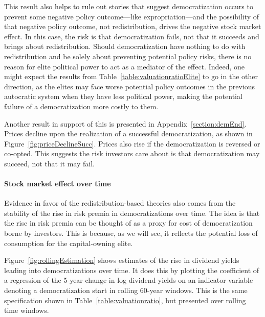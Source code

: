 

\label{par:rule_out_expro_beg}
This result also helps to rule out stories that suggest democratization occurs to prevent some negative policy outcome---like expropriation---and the possibility of that negative policy outcome, not redistribution, drives the negative stock market effect. In this case, the risk is that democratization fails, not that it succeeds and brings about redistribution. Should democratization have nothing to do with redistribution and be solely about preventing potential policy risks, there is no reason for elite political power to act as a mediator of the effect. Indeed, one might expect the results from Table~\ref{table:valuationratioElite} to go in the other direction, as the elites may face worse potential policy outcomes in the previous autocratic system when they have less political power, making the potential failure of a democratization more costly to them.

Another result in support of this is presented in Appendix~\ref{section:demEnd}. Prices decline upon the realization of a successful democratization, as shown in Figure~\ref{fig:priceDeclineSucc}. Prices also rise if the democratization is reversed or co-opted. This suggests the risk investors care about is that democratization may succeed, not that it may fail.
\label{par:rule_out_expro_end}

\paragraph{Stock market effect over time}

Evidence in favor of the redistribution-based theories also comes from the stability of the rise in risk premia in democratizations over time. The idea is that the rise in risk premia can be thought of as a proxy for cost of democratization borne by investors. This is because, as we will see, it reflects the potential loss of consumption for the capital-owning elite. 

Figure~\ref{fig:rollingEstimation} shows estimates of the rise in dividend yields leading into democratizations over time. It does this by plotting the coefficient of a regression of the 5-year change in log dividend yields on an indicator variable denoting a democratization start in rolling 60-year windows. This is the same specification shown in Table~\ref{table:valuationratio}, but presented over rolling time windows.

